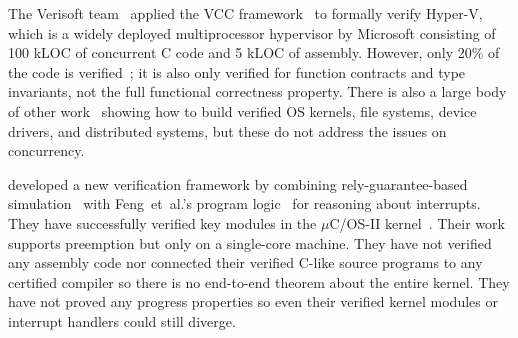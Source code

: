 
The Verisoft team~\cite{verisoft07,leinenbach09,alkassar10} applied
the VCC framework~\cite{vcc09} to formally verify Hyper-V, which is a
widely deployed multiprocessor hypervisor by Microsoft consisting of
100 kLOC of concurrent C code and 5 kLOC of assembly. However, only
20\% of the code is verified~\cite{vcc09}; it is also only verified
for function contracts and type invariants, not the full functional
correctness property.  There is also a large body of other
work~\cite{bevier89,hawblitzel10,ironclad14,fscq15,ironfleet15,verdi15,cogent16}
showing how to build verified OS kernels, file systems, device
drivers, and distributed systems, but these do not address the issues
on concurrency.

\citet{xu16} developed a new verification framework by combining
rely-guarantee-based simulation~\cite{RGSim} with Feng~{et~al.}'s
program logic~\cite{feng08:aim} for reasoning about interrupts. They
have successfully verified key modules in the $\mu$C/OS-II
kernel~\cite{ucosii}. Their work supports preemption but only on a
single-core machine. They have not verified any assembly code nor
connected their verified C-like source programs to any certified
compiler so there is no end-to-end theorem about the entire
kernel. They have not proved any progress properties so even their
verified kernel modules or interrupt handlers could still diverge.

